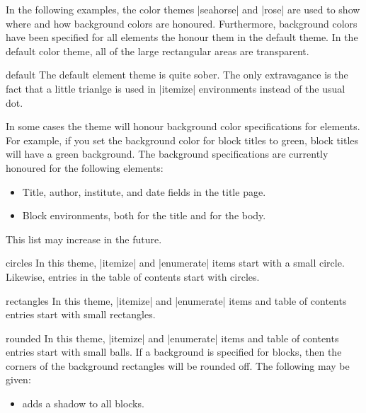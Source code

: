 In the following examples, the color themes |seahorse| and |rose| are
used to show where and how background colors are
honoured. Furthermore, background colors have been specified for all
elements the honour them in the default theme. In the default color
theme, all of the large rectangular areas are transparent.

\begin{elementthemeexample}{default}
  The default element theme is quite sober. The only extravagance is
  the fact that a little trianlge is used in |itemize| environments
  instead of the usual dot.

  In some cases the theme will honour background color specifications
  for elements. For example, if you set the background color for block
  titles to green, block titles will have a green background. The
  background specifications are currently honoured for the following
  elements: 
  \begin{itemize}
  \item Title, author, institute, and date fields in the title
    page.
  \item Block environments, both for the title and for the body.
  \end{itemize}
  This list may increase in the future.
\end{elementthemeexample}

\begin{elementthemeexample}{circles}
  In this theme, |itemize| and |enumerate| items start with a small
  circle. Likewise, entries in the table of contents start with
  circles. 
\end{elementthemeexample}

\begin{elementthemeexample}{rectangles}
  In this theme, |itemize| and |enumerate| items and table of contents
  entries  start with small rectangles. 
\end{elementthemeexample}

\begin{elementthemeexample}{rounded}
  In this theme, |itemize| and |enumerate| items and table of contents
  entries start with small balls. If a background is specified for
  blocks, then the corners of the background rectangles will be
  rounded off. The following  may be given:

  \begin{itemize}
  \item {} adds a shadow to all blocks.
  \end{itemize}
\end{elementthemeexample}




